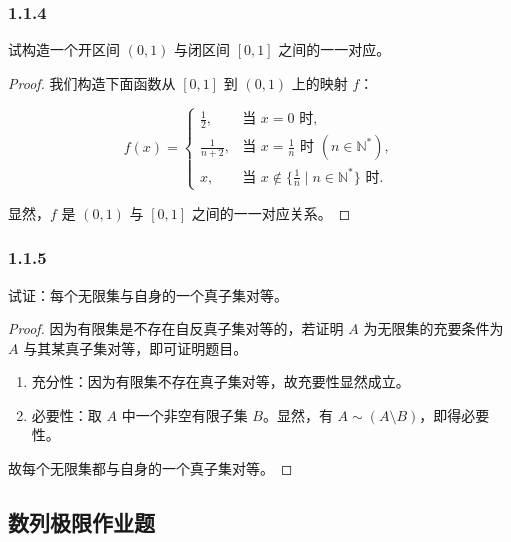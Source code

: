 \documentclass[12pt]{ctexart}
\begin{document}
\subsubsection*{1.1.4} 
试构造一个开区间 $(0, 1)$ 与闭区间 $[0, 1]$ 之间的一一对应。
\begin{proof}
我们构造下面函数从 $[0, 1]$ 到 $(0, 1)$ 上的映射 $f$：

\[
f(x) =
\begin{cases} 
\frac{1}{2}, & \text{当 } x = 0 \text{ 时}, \\
\frac{1}{n+2}, & \text{当 } x = \frac{1}{n} \text{ 时 } (n \in \mathbb{N}^*), \\
x, & \text{当 } x \notin \{\frac{1}{n} \mid n \in \mathbb{N}^*\} \text{ 时}.
\end{cases}
\]

显然，$f$ 是 $(0, 1)$ 与 $[0, 1]$ 之间的一一对应关系。
\end{proof}

\subsubsection*{1.1.5} 
试证：每个无限集与自身的一个真子集对等。
\begin{proof}
因为有限集是不存在自反真子集对等的，若证明 $A$ 为无限集的充要条件为 $A$ 与其某真子集对等，即可证明题目。

\begin{enumerate}
    \item 充分性：因为有限集不存在真子集对等，故充要性显然成立。
    \item 必要性：取 $A$ 中一个非空有限子集 $B$。显然，有 $A \sim (A \setminus B)$，即得必要性。
\end{enumerate}

故每个无限集都与自身的一个真子集对等。
\end{proof}

\subsection{数列极限作业题}
\end{document}
